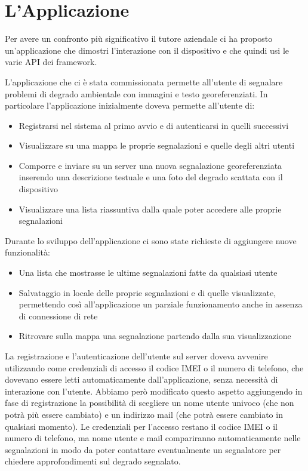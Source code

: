 \chapter{L'Applicazione}
	Per avere un confronto più significativo il tutore aziendale ci ha proposto 
	un'applicazione che dimostri l'interazione con il dispositivo e che quindi 
	usi le varie API dei framework.
	
	L'applicazione che ci è stata commissionata permette all'utente di segnalare 
	problemi di degrado ambientale con immagini e testo georeferenziati.
	In particolare l'applicazione inizialmente doveva permette all'utente di:
	\begin{itemize}
	\item Registrarsi nel sistema al primo avvio e di autenticarsi in quelli successivi
	\item Visualizzare su una mappa le proprie segnalazioni e quelle degli altri utenti
	\item Comporre e inviare su un server una nuova segnalazione georeferenziata inserendo 
	una descrizione testuale e una foto del degrado scattata con il dispositivo
	\item Visualizzare una lista riassuntiva dalla quale poter accedere alle proprie segnalazioni
	\end{itemize}
	Durante lo sviluppo dell'applicazione ci sono state richieste di aggiungere 
	nuove funzionalità:
	\begin{itemize}
	\item Una lista che mostrasse le ultime segnalazioni fatte da qualsiasi utente
	\item Salvataggio in locale delle proprie segnalazioni e di quelle 
	visualizzate, permettendo così all'applicazione un parziale funzionamento anche in 
	assenza di connessione di rete
	\item Ritrovare sulla mappa una segnalazione partendo dalla sua visualizzazione
	\end{itemize}
	
	La registrazione e l'autenticazione dell'utente sul server doveva avvenire 
	utilizzando come credenziali di accesso il codice IMEI o il numero di telefono, 
	che dovevano essere letti automaticamente dall'applicazione, senza necessità 
	di interazione con l'utente.
	Abbiamo però modificato questo aspetto aggiungendo in fase di registrazione 
	la possibilità di scegliere un nome utente univoco 
	(che non potrà più essere cambiato) e un indirizzo mail (che potrà essere 
	cambiato in qualsiasi momento). Le credenziali per l'accesso restano il codice 
	IMEI o il numero di telefono, ma nome utente e mail compariranno automaticamente 
	nelle segnalazioni in modo da poter contattare eventualmente un segnalatore per 
	chiedere approfondimenti sul degrado segnalato.
	

